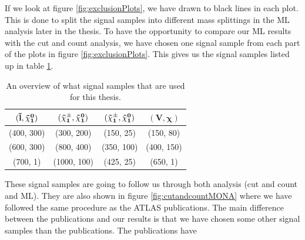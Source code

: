If we look at figure \ref{fig:exclusionPlots}, we have drawn to black lines in each plot. This is done to split the signal samples into different mass splittings in the ML analysis later in the thesis. To have the opportunity to compare our ML results with the cut and count analysis, we have chosen one signal sample from each part of the plots in figure \ref{fig:exclusionPlots}. This gives us the signal samples listed up in table \ref{tab:sigsampcutandcount}.
\begin{table}[H]
    \centering
    \begin{tabular}{c c c c}
    \toprule
    $\mathbf{(\Tilde{l}, \Tilde{\chi}_1^0)}$ & $\mathbf{(\Tilde{\chi}_1^\pm, \Tilde{\chi}_1^0)}$ & $\mathbf{(\Tilde{\chi}_1^\pm, \Tilde{\chi}_1^0)}$ & $\mathbf{( V, \chi)}$  \\
    \midrule
    \midrule
    (400, 300) & (300, 200) & (150, 25) & (150, 80)\\
    (600, 300) & (800, 400) & (350, 100) & (400, 150)\\
    (700, 1) & (1000, 100) & (425, 25) & (650, 1)\\
    \bottomrule
    \end{tabular}
    \caption{An overview of what signal samples that are used for this thesis.}
    \label{tab:sigsampcutandcount}
\end{table}

These signal samples are going to follow us through both analysis (cut and count and ML). They are also shown in figure \ref{fig:cutandcountMONA} where we have followed the same procedure as the ATLAS publications. The main difference between the publications and our results is that we have chosen some other signal samples than the publications. The publications have 


